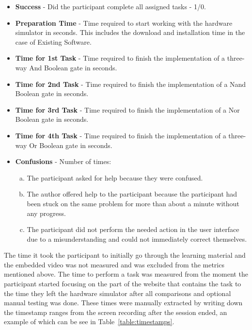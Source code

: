 \begin{itemize}
    \item \textbf{Success} - Did the participant complete all assigned tasks - 1/0.
    \item \textbf{Preparation Time} - Time required to start working with the hardware simulator in seconds. This includes the download and installation time in the case of Existing Software.
    \item \textbf{Time for 1st Task} - Time required to finish the implementation of a three-way And Boolean gate in seconds.
    \item \textbf{Time for 2nd Task} - Time required to finish the implementation of a Nand Boolean gate in seconds.
    \item \textbf{Time for 3rd Task} - Time required to finish the implementation of a Nor Boolean gate in seconds.
    \item \textbf{Time for 4th Task} - Time required to finish the implementation of a three-way Or Boolean gate in seconds.
    \item \textbf{Confusions} - Number of times:
    \begin{enumerate}[(a)]
        \item The participant asked for help because they were confused.
        \item The author offered help to the participant because the participant had been stuck on the same problem for more than about a minute without any progress.
        \item The participant did not perform the needed action in the user interface due to a misunderstanding and could not immediately correct themselves.
    \end{enumerate}
\end{itemize}

The time it took the participant to initially go through the learning material and the embedded video was not measured and was excluded from the metrics mentioned above.
The time to perform a task was measured from the moment the participant started focusing on the part of the website that contains the task to the time they left the hardware simulator after all comparisons and optional manual testing was done.
These times were manually extracted by writing down the timestamp ranges from the screen recording after the session ended, an example of which can be see in Table~\ref{table:timestamps}.


